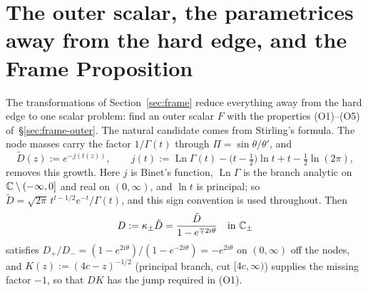 \providecommand{\eps}{\varepsilon}
\providecommand{\Log}{\operatorname{Log}}
\providecommand{\re}{\operatorname{Re}}
\providecommand{\im}{\operatorname{Im}}
\providecommand{\thlip}{\vartheta_{\mathrm{lip}}}
\providecommand{\thseam}{\vartheta_{\mathrm{seam}}}
\providecommand{\thw}{\vartheta_{\mathrm{w}}}
\providecommand{\Ob}{\Omega_{\mathrm{b}}}
\providecommand{\Osat}{\Omega^{\triangle}}
\providecommand{\Oinf}{\Omega_{\infty}}
\providecommand{\Sin}{S_{\mathrm{in}}}
\providecommand{\Sout}{S_{\mathrm{out}}}
\providecommand{\Zn}{\mathcal{Z}_n}
\providecommand{\tvphi}{\tilde\varphi}
\providecommand{\Fi}[1]{\textup{(F#1)}}
\providecommand{\Cauchy}{\mathcal{C}}
\providecommand{\dC}{\partial\mathcal{C}}
\providecommand{\Ath}[1]{\textup{(A$_{#1}$)}}
\providecommand{\wn}{\mathsf w_n}
\providecommand{\Hc}{H^{\circ}_n}

\section{The outer scalar, the parametrices away from the hard edge, and the Frame Proposition}\label{sec:outer}

The transformations of Section~\ref{sec:frame} reduce everything away from the hard edge to one scalar problem: find
an outer scalar $F$ with the properties (O1)--(O5) of~\S\ref{sec:frame-outer}. The natural candidate comes from
Stirling's formula. The node masses carry the factor $1/\Gamma(t)$ through $\Pi=\sin\theta/\theta'$, and
\[
  \tilde D(z):=e^{-j(t(z))},\qquad j(t):=\operatorname{Ln}\Gamma(t)-\bigl(t-\tfrac12\bigr)\ln t+t-\tfrac12\ln(2\pi),
\]
removes this growth. Here $j$ is Binet's function, $\operatorname{Ln}\Gamma$ is the branch analytic on
$\mathbb{C}\setminus(-\infty,0]$ and real on $(0,\infty)$, and $\ln t$ is principal; so
$\tilde D=\sqrt{2\pi}\,t^{t-1/2}e^{-t}/\Gamma(t)$, and this sign convention is used throughout. Then
\begin{equation}\label{eq:D}
  D:=\kappa_\pm\tilde D=\frac{\tilde D}{1-e^{\mp2i\theta}}\quad\text{in }\mathbb{C}_\pm
\end{equation}
satisfies $D_+/D_-=(1-e^{2i\theta})/(1-e^{-2i\theta})=-e^{2i\theta}$ on $(0,\infty)$ off the nodes, and
$K(z):=(4c-z)^{-1/2}$ (principal branch, cut $[4c,\infty)$) supplies the missing factor $-1$, so that $DK$ has the
jump required in (O1).

